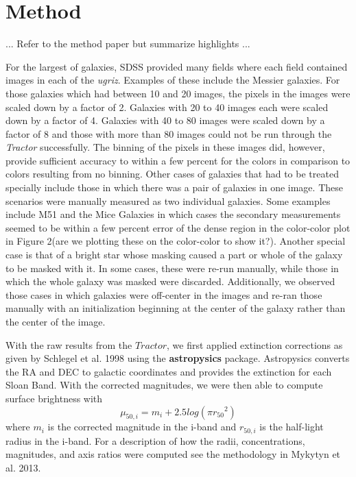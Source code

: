 \documentclass[12pt,preprint,pdftex]{aastex}
\begin{document}
\section{Method}

... Refer to the method paper but summarize highlights ...

For the largest of galaxies, SDSS provided many fields where each field contained images in each of the \textit{ugriz}. Examples of these include the Messier galaxies. For those galaxies which had between 10 and 20 images, the pixels in the images were scaled down by a factor of 2. Galaxies with 20 to 40 images each were scaled down by a factor of 4. Galaxies with 40 to 80 images were scaled down by a factor of 8 and those with more than 80 images could not be run through the \textit{Tractor} successfully. The binning of the pixels in these images did, however, provide sufficient accuracy to within a few percent for the colors in comparison to colors resulting from no binning. Other cases of galaxies that had to be treated specially include those in which there was a pair of galaxies in one image. These scenarios were manually measured as two individual galaxies. Some examples include M51 and the Mice Galaxies in which cases the secondary measurements seemed to be within a few percent error of the dense region in the color-color plot in Figure 2(are we plotting these on the color-color to show it?). Another special case is that of a bright star whose masking caused a part or whole of the galaxy to be masked with it. In some cases, these were re-run manually, while those in which the whole galaxy was masked were discarded.  Additionally, we observed those cases in which galaxies were off-center in the images and re-ran those manually with an initialization beginning at the center of the galaxy rather than the center of the image. 

With the raw results from the $Tractor$, we first applied extinction corrections as given by Schlegel et al. 1998 using the \textbf{astropysics} package. Astropysics converts the RA and DEC to galactic coordinates and provides the extinction for each Sloan Band. With the corrected magnitudes, we were then able to compute surface brightness with \begin{equation} \mu_{50,i}=m_i+2.5log(\pi{r_{50}}^2) \end{equation} where $m_i$ is the corrected magnitude in the i-band and $r_{50,i}$ is the half-light radius in the i-band. For a description of how the radii, concentrations, magnitudes, and axis ratios were computed see the methodology in Mykytyn et al. 2013. 
\end{document}
